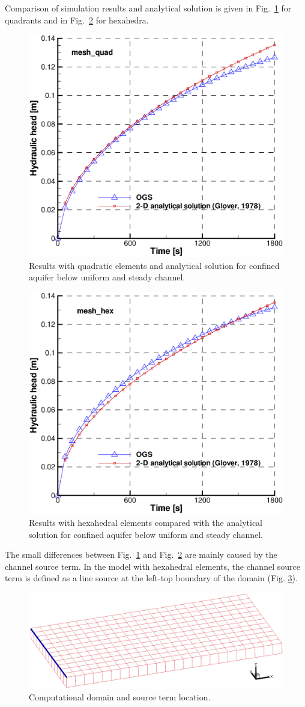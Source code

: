 Comparison of simulation results and analytical solution is given in Fig.~\ref{GW_Results_ChannelPercolation_quad}
for quadrants and in Fig.~\ref{GW_Results_ChannelPercolation_hex} for hexahedra.
%
\begin{figure} [htb!]
 \centering
\includegraphics[width=0.6\columnwidth] {Chapter5/figure/riv1_quad_point.eps}
\caption{Results with quadratic elements and analytical solution for confined aquifer below uniform and steady channel.}
 \label{GW_Results_ChannelPercolation_quad}
\end{figure}
%
\begin{figure} [htb!]
 \centering
\includegraphics[width=0.6\columnwidth] {Chapter5/figure/riv1_hex_point.eps}
\caption{Results with hexahedral elements compared with the analytical solution for confined aquifer below uniform and steady channel.}
 \label{GW_Results_ChannelPercolation_hex}
\end{figure}

The small differences between Fig.~\ref{GW_Results_ChannelPercolation_quad} and Fig.~\ref{GW_Results_ChannelPercolation_hex} are mainly caused by the channel source term. In the model with hexahedral elements, the channel source term is defined as a line source at the left-top boundary of the domain (Fig. \ref{channel_location}). 

\begin{figure} [htb!]
 \centering
\includegraphics[width=0.8\columnwidth] {Chapter5/figure/channel_location.eps}
\caption{Computational domain and source term location.}
 \label{channel_location}
\end{figure}
